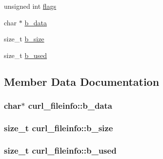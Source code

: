 \begin{DoxyCompactItemize}
\begin{tabbing}
\end{tabbing}\item 
unsigned int \hyperlink{structcurl__fileinfo_a4db8370a5202c50f4e3cf57bc0002c79}{flags}
\item 
char $\ast$ \hyperlink{structcurl__fileinfo_a3cf37a35ea7150ebf3b084c8804832c5}{b\+\_\+data}
\item 
size\+\_\+t \hyperlink{structcurl__fileinfo_a4831476a8e9e0af283275d04cc2b4108}{b\+\_\+size}
\item 
size\+\_\+t \hyperlink{structcurl__fileinfo_a35a78449a69e80e8c1d28449fcae89b9}{b\+\_\+used}
\end{DoxyCompactItemize}


\subsection{Member Data Documentation}
\hypertarget{structcurl__fileinfo_a3cf37a35ea7150ebf3b084c8804832c5}{}
\subsubsection[{b\+\_\+data}]{\setlength{\rightskip}{0pt plus 5cm}char$\ast$ curl\+\_\+fileinfo\+::b\+\_\+data}\label{structcurl__fileinfo_a3cf37a35ea7150ebf3b084c8804832c5}
\hypertarget{structcurl__fileinfo_a4831476a8e9e0af283275d04cc2b4108}{}
\subsubsection[{b\+\_\+size}]{\setlength{\rightskip}{0pt plus 5cm}size\+\_\+t curl\+\_\+fileinfo\+::b\+\_\+size}\label{structcurl__fileinfo_a4831476a8e9e0af283275d04cc2b4108}
\hypertarget{structcurl__fileinfo_a35a78449a69e80e8c1d28449fcae89b9}{}
\subsubsection[{b\+\_\+used}]{\setlength{\rightskip}{0pt plus 5cm}size\+\_\+t curl\+\_\+fileinfo\+::b\+\_\+used}\label{structcurl__fileinfo_a35a78449a69e80e8c1d28449fcae89b9}
\hypertarget{structcurl__fileinfo_ae42985a10c5ac94b2ac09c5e75c05e40}{}
